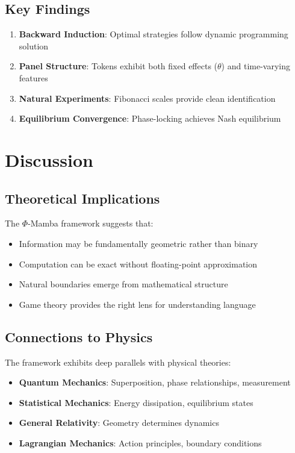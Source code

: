\documentclass[11pt,a4paper]{article}
\begin{document}
\subsection{Key Findings}

\begin{enumerate}
    \item \textbf{Backward Induction}: Optimal strategies follow dynamic programming solution
    \item \textbf{Panel Structure}: Tokens exhibit both fixed effects ($\theta$) and time-varying features
    \item \textbf{Natural Experiments}: Fibonacci scales provide clean identification
    \item \textbf{Equilibrium Convergence}: Phase-locking achieves Nash equilibrium
\end{enumerate}

\section{Discussion}

\subsection{Theoretical Implications}

The $\Phi$-Mamba framework suggests that:
\begin{itemize}
    \item Information may be fundamentally geometric rather than binary
    \item Computation can be exact without floating-point approximation
    \item Natural boundaries emerge from mathematical structure
    \item Game theory provides the right lens for understanding language
\end{itemize}

\subsection{Connections to Physics}

The framework exhibits deep parallels with physical theories:
\begin{itemize}
    \item \textbf{Quantum Mechanics}: Superposition, phase relationships, measurement
    \item \textbf{Statistical Mechanics}: Energy dissipation, equilibrium states
    \item \textbf{General Relativity}: Geometry determines dynamics
    \item \textbf{Lagrangian Mechanics}: Action principles, boundary conditions
\end{itemize}
\end{document}
